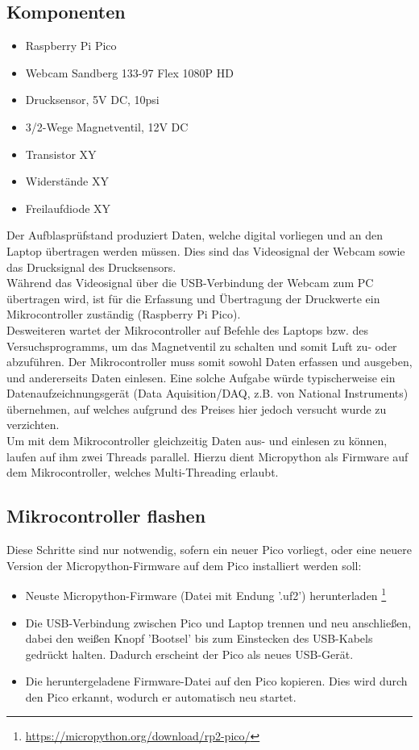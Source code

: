 \documentclass[german, 11pt]{scrartcl}
\begin{document}
\subsection{Komponenten}
\begin{itemize}
    \item Raspberry Pi Pico
    \item Webcam Sandberg 133-97 Flex 1080P HD
    \item Drucksensor, 5V DC, 10psi
    \item 3/2-Wege Magnetventil, 12V DC
    \item Transistor XY
    \item Widerstände XY
    \item Freilaufdiode XY
\end{itemize}

Der Aufblasprüfstand produziert Daten, welche digital vorliegen und an den Laptop übertragen werden müssen.
Dies sind das Videosignal der Webcam sowie das Drucksignal des Drucksensors.\\

Während das Videosignal über die USB-Verbindung der Webcam zum PC übertragen wird,
ist für die Erfassung und Übertragung der Druckwerte ein Mikrocontroller zuständig (Raspberry Pi Pico).\\

Desweiteren wartet der Mikrocontroller auf Befehle des Laptops bzw. des Versuchsprogramms, um das Magnetventil zu schalten
und somit Luft zu- oder abzuführen.
Der Mikrocontroller muss somit sowohl Daten erfassen und ausgeben, und andererseits Daten einlesen.
Eine solche Aufgabe würde typischerweise ein Datenaufzeichnungsgerät (Data Aquisition/DAQ, z.B. von National Instruments) übernehmen,
auf welches aufgrund des Preises hier jedoch versucht wurde zu verzichten.\\

Um mit dem Mikrocontroller gleichzeitig Daten aus- und einlesen zu können, laufen auf ihm zwei Threads parallel.
Hierzu dient Micropython als Firmware auf dem Mikrocontroller, welches Multi-Threading erlaubt.

\subsection{Mikrocontroller flashen}
Diese Schritte sind nur notwendig, sofern ein neuer Pico vorliegt, oder eine neuere Version der Micropython-Firmware
auf dem Pico installiert werden soll:

\begin{itemize}
    \item Neuste Micropython-Firmware (Datei mit Endung '.uf2') herunterladen \footnote[1]{\url{https://micropython.org/download/rp2-pico/}}
    \item Die USB-Verbindung zwischen Pico und Laptop trennen und neu anschließen, dabei den weißen Knopf 'Bootsel' bis zum Einstecken des USB-Kabels gedrückt halten. Dadurch erscheint der Pico als neues USB-Gerät.
    \item Die heruntergeladene Firmware-Datei auf den Pico kopieren. Dies wird durch den Pico erkannt, wodurch er automatisch neu startet.
\end{itemize}
\end{document}
